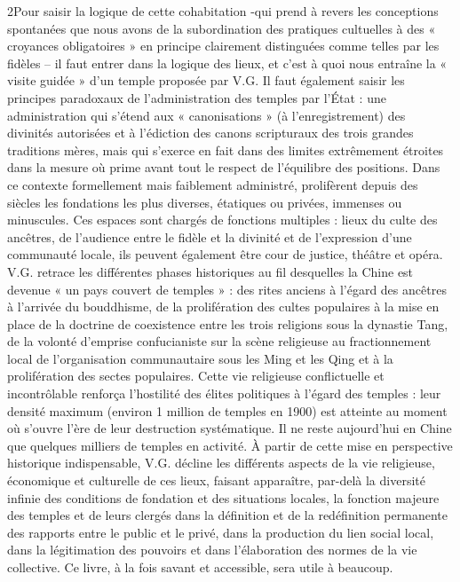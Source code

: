 2Pour saisir la logique de cette cohabitation -qui prend à revers les conceptions spontanées que nous avons de la subordination des pratiques cultuelles à des « croyances obligatoires » en principe clairement distinguées comme telles par les fidèles – il faut entrer dans la logique des lieux, et c’est à quoi nous entraîne la « visite guidée » d’un temple proposée par V.G. Il faut également saisir les principes paradoxaux de l’administration des temples par l’État : une administration qui s’étend aux « canonisations » (à l’enregistrement) des divinités autorisées et à l’édiction des canons scripturaux des trois grandes traditions mères, mais qui s’exerce en fait dans des limites extrêmement étroites dans la mesure où prime avant tout le respect de l’équilibre des positions. Dans ce contexte formellement mais faiblement administré, prolifèrent depuis des siècles les fondations les plus diverses, étatiques ou privées, immenses ou minuscules. Ces espaces sont chargés de fonctions multiples : lieux du culte des ancêtres, de l’audience entre le fidèle et la divinité et de l’expression d’une communauté locale, ils peuvent également être cour de justice, théâtre et opéra. V.G. retrace les différentes phases historiques au fil desquelles la Chine est devenue « un pays couvert de temples » : des rites anciens à l’égard des ancêtres à l’arrivée du bouddhisme, de la prolifération des cultes populaires à la mise en place de la doctrine de coexistence entre les trois religions sous la dynastie Tang, de la volonté d’emprise confucianiste sur la scène religieuse au fractionnement local de l’organisation communautaire sous les Ming et les Qing et à la prolifération des sectes populaires. Cette vie religieuse conflictuelle et incontrôlable renforça l’hostilité des élites politiques à l’égard des temples : leur densité maximum (environ 1 million de temples en 1900) est atteinte au moment où s’ouvre l’ère de leur destruction systématique. Il ne reste aujourd’hui en Chine que quelques milliers de temples en activité. À partir de cette mise en perspective historique indispensable, V.G. décline les différents aspects de la vie religieuse, économique et culturelle de ces lieux, faisant apparaître, par-delà la diversité infinie des conditions de fondation et des situations locales, la fonction majeure des temples et de leurs clergés dans la définition et de la redéfinition permanente des rapports entre le public et le privé, dans la production du lien social local, dans la légitimation des pouvoirs et dans l’élaboration des normes de la vie collective. Ce livre, à la fois savant et accessible, sera utile à beaucoup.


